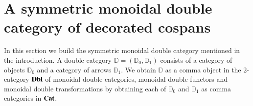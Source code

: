 \documentclass{amsart}
\begin{document}

\section{A symmetric monoidal double category of decorated cospans}\label{DecCospansDoublecat}
In this section we build the symmetric monoidal double category mentioned in the introduction. A double category $\mathbb{D}=(\mathbb{D}_0,\mathbb{D}_1)$ consists of a category of objects $\mathbb{D}_0$ and a category of arrows $\mathbb{D}_1$. We obtain $\mathbb{D}$ as a comma object in the 2-category $\bold{Dbl}$ of monoidal double categories, monoidal double functors and monoidal double transformations by obtaining each of $\mathbb{D}_0$ and $\mathbb{D}_1$ as comma categories in $\bold{Cat}$.
\end{document}
